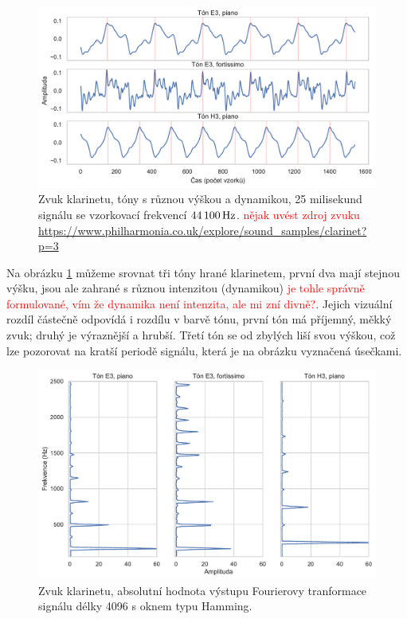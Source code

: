 \begin{figure}[h]\centering
\includegraphics[width=\textwidth,height=\textheight,keepaspectratio]{../img/audio_clarinet}
\caption{Zvuk klarinetu, tóny s různou výškou a dynamikou, 25 milisekund signálu se vzorkovací frekvencí $44\,100\,\rm Hz$. \textcolor{red}{nějak uvést zdroj zvuku \url{https://www.philharmonia.co.uk/explore/sound_samples/clarinet?p=3}}}
\label{obr:audio_clarinet}
\end{figure}

Na obrázku \ref{obr:audio_clarinet} můžeme srovnat tři tóny hrané klarinetem, první dva mají stejnou výšku, jsou ale zahrané s různou intenzitou (dynamikou) \textcolor{red}{je tohle správně formulované, vím že dynamika není intenzita, ale  mi zní divně?}. Jejich vizuální rozdíl částečně odpovídá i rozdílu v barvě tónu, první tón má příjemný, měkký zvuk; druhý je výraznější a hrubší. Třetí tón se od zbylých liší svou výškou, což lze pozorovat na kratší periodě signálu, která je na obrázku vyznačená úsečkami. 

\begin{figure}[h]\centering
\includegraphics[width=\textwidth,height=\textheight,keepaspectratio]{../img/audio_clarinet_dft}
\caption{Zvuk klarinetu, absolutní hodnota výstupu Fourierovy tranformace signálu délky 4096 s oknem typu Hamming.}
\label{obr:audio_clarinet_dft}
\end{figure}

